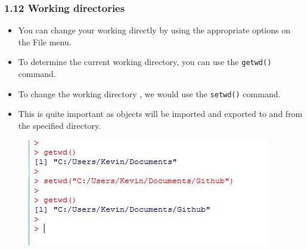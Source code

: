 \documentclass{beamer}
\begin{document}
 	
 	
 	
 	\begin{frame}
 		\frametitle{1.12 Working directories}
 		\large
 		\begin{itemize}
 			\item You can change your working directly by using the appropriate options on the File menu. 
 			\item To
 			determine the current working directory, you can use the \texttt{getwd()} command. 
 			\item To change the
 			working directory , we would use the \texttt{setwd()} command.
 			\item  This is quite important as objects
 			will be imported and exported to and from the specified directory.
 		\end{itemize}
 	\end{frame}
 	\begin{frame}
 		\begin{figure}
 			\centering
 			\includegraphics[width=1.2\linewidth]{images/workingdir}
 			
 		\end{figure}
 		
 	\end{frame}
 	
\end{document}
